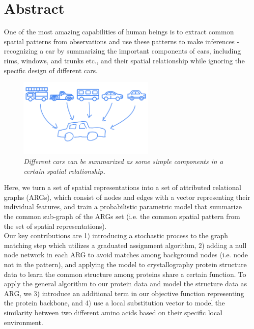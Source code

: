 \chapter*{Abstract}

One of the most amazing capabilities of human beings is to extract common spatial patterns from observations and use these patterns to make inferences - recognizing a car by summarizing the important components of cars, including rims, windows, and trunks etc., and their spatial relationship while ignoring the specific design of different cars. 

\begin{figure}[h]
	\centering
	\captionsetup{justification=centering}
	\includegraphics[width=0.6\textwidth]{figs/car_summary.png}
	\caption[Caption for LOF]{\emph{Different cars can be summarized as some simple components in a certain spatial relationship.\footnotemark}}
	\label{fig:car_summary}
\end{figure}

Here, we turn a set of spatial representations into a set of attributed relational graphs (ARGs), which consist of nodes and edges with a vector representing their individual features, and train a probabilistic parametric model that summarize the common sub-graph of the ARGs set (i.e. the common spatial pattern from the set of spatial representations).\\

Our key contributions are 1) introducing a stochastic process to the graph matching step which utilizes a graduated assignment algorithm, 2) adding a null node network in each ARG to avoid matches among background nodes (i.e. node not in the pattern), and applying the model to crystallography protein structure data to learn the common structure among proteins share a certain function. To apply the general algorithm to our protein data and model the structure data as ARG, we 3) introduce an additional term in our objective function representing the protein backbone, and 4) use a local substitution vector to model the similarity between two different amino acids based on their specific local environment.\\

